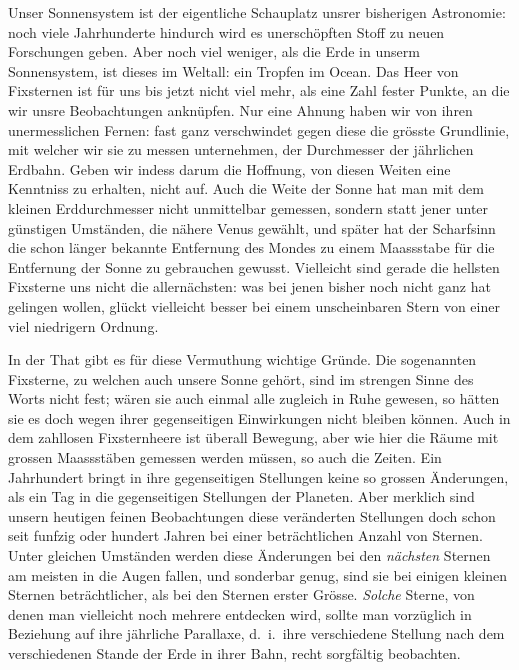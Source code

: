 Unser Sonnensystem ist der eigentliche Schauplatz unsrer bisherigen Astronomie: noch viele Jahrhunderte hindurch wird es unerschöpften Stoff zu neuen Forschungen geben. Aber noch viel weniger, als die Erde in unserm Sonnensystem, ist dieses im Weltall: ein Tropfen im Ocean. Das Heer von Fixsternen ist für uns bis jetzt nicht viel mehr, als eine Zahl fester Punkte, an die wir unsre Beobachtungen anknüpfen. Nur eine Ahnung haben wir von ihren unermesslichen Fernen: fast ganz verschwindet gegen diese die grösste Grundlinie, mit welcher wir sie zu messen unternehmen, der Durchmesser der jährlichen Erdbahn. Geben wir indess darum die Hoffnung, von diesen Weiten eine Kenntniss zu erhalten, nicht auf. Auch die Weite der Sonne hat man mit dem kleinen Erddurchmesser nicht unmittelbar gemessen, sondern statt jener unter günstigen Umständen, die nähere Venus gewählt{\renewcommand{\thefootnote}{**)}}, und später hat der Scharfsinn die schon länger bekannte Entfernung des Mondes zu einem Maassstabe für die Entfernung der Sonne zu gebrauchen gewusst{\renewcommand{\thefootnote}{***)}}. Vielleicht sind gerade die hellsten Fixsterne uns nicht die allernächsten: was bei jenen bisher noch nicht ganz hat gelingen wollen, glückt vielleicht besser bei einem unscheinbaren Stern von einer viel niedrigern Ordnung.

In der That gibt es für diese Vermuthung wichtige Gründe. Die sogenannten Fixsterne, zu welchen auch unsere Sonne gehört, sind im strengen Sinne des Worts nicht fest; wären sie auch einmal alle zugleich in Ruhe gewesen, so hätten sie es doch wegen ihrer gegenseitigen Einwirkungen nicht bleiben können. Auch in dem zahllosen Fixsternheere ist überall Bewegung, aber wie hier die Räume mit grossen Maassstäben gemessen werden müssen, so auch die Zeiten.
%
Ein Jahrhundert bringt in ihre gegenseitigen Stellungen keine so grossen Änderungen, als ein Tag in die gegenseitigen Stellungen der Planeten. Aber merklich sind unsern heutigen feinen Beobachtungen diese veränderten Stellungen doch schon seit funfzig oder hundert Jahren bei einer beträchtlichen Anzahl von Sternen. Unter gleichen Umständen werden diese Änderungen bei den \emph{nächsten} Sternen am meisten in die Augen fallen, und sonderbar genug, sind sie bei einigen kleinen Sternen beträchtlicher, als bei den Sternen erster Grösse. \emph{Solche} Sterne, von denen man vielleicht noch mehrere entdecken wird, sollte man vorzüglich in Beziehung auf ihre jährliche Parallaxe, d.\ i.\ ihre verschiedene Stellung nach dem verschiedenen Stande der Erde in ihrer Bahn, recht sorgfältig beobachten.

